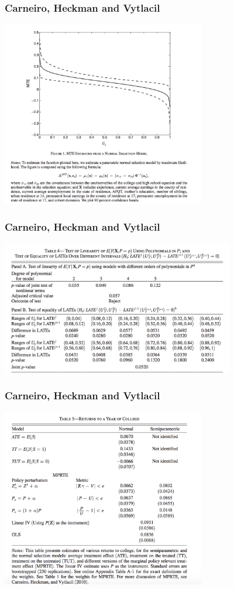 \documentclass[xcolor=pdftex,dvipsnames,table,mathserif,aspectratio=169]{beamer}
\begin{document}
\begin{frame}
\frametitle{Carneiro, Heckman and Vytlacil}
\begin{center}
\includegraphics[width=3.5in]{./resources/chv_fig1}
\end{center}
\end{frame}

\begin{frame}
\frametitle{Carneiro, Heckman and Vytlacil}
\begin{center}
\includegraphics[width=4in]{./resources/chv_tab4}
\end{center}
\end{frame}

\begin{frame}
\frametitle{Carneiro, Heckman and Vytlacil}
\begin{center}
\includegraphics[width=3.5in]{./resources/chv_tab5}
\end{center}
\end{frame}
\end{document}
